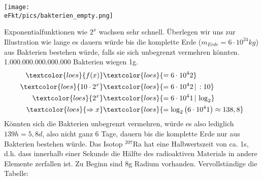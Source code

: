 \begin{minipage}{0.49\textwidth}\centering
	\texttt{[image: \\eFkt/pics/bakterien\_empty.png]}
\end{minipage}
Exponentialfunktionen wie \(2^x\) wachsen sehr schnell. Überlegen wir uns zur Illustration wie lange es dauern würde bis die komplette Erde (\(m_{Erde}=6\cdot 10^{24}kg\)) aus Bakterien bestehen würde, falls sie sich unbegrenzt vermehren könnten. 1.000.000.000.000.000 Bakterien wiegen 1g.
\begin{align*}
	\textcolor{loes}{f(x)}&\textcolor{loes}{=6\cdot 10^42}\\
	\textcolor{loes}{10\cdot 2^x}&\textcolor{loes}{=6\cdot 10^42\,\vert\,:10}\\
	\textcolor{loes}{2^x}&\textcolor{loes}{=6\cdot 10^41\,\vert\,\log_2}\\
	\textcolor{loes}{\Rightarrow x}&\textcolor{loes}{=\log_2\left( 6\cdot 10^41\right) \approx 138,8}
\end{align*}
\textcolor{loes}{Könnten sich die Bakterien unbegrenzt vermehren, würde es also lediglich \(139h=5,8d\), also nicht ganz 6 Tage, dauern bis die komplette Erde nur aus Bakterien bestehen würde.}
\newpage
Das Isotop \(^{207}\)Ra hat eine Halbwertszeit von ca. 1s, d.h. dass innerhalb einer Sekunde die Hälfte des radioaktiven Materials in andere Elemente zerfallen ist. Zu Beginn sind 8g Radium vorhanden. Vervollständige die Tabelle:\\
\vspace{0.3cm}\\
